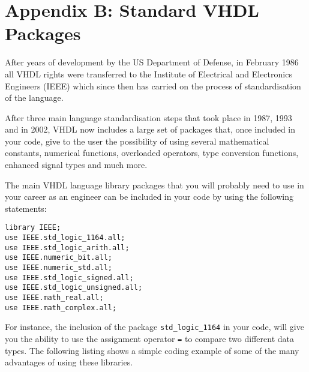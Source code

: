 \null\newpage
\thispagestyle{empty}
\mbox{}

\chapter{Appendix B: Standard VHDL Packages}
After years of development by the US Department of Defense, in February 1986 all VHDL rights were transferred to the Institute of Electrical and Electronics Engineers (IEEE) which since then has carried on the process of standardisation of the language. 

After three main language standardisation steps that took place in 1987, 1993 and in 2002, VHDL now includes a large set of packages that, once included in your code, give to the user the possibility of using several mathematical constants, numerical functions, overloaded operators, type conversion functions, enhanced signal types and much more.

The main VHDL language library packages that you will probably need to use in your career as an engineer can be included in your code by using the following statements:

\begin{verbatim}
library IEEE;
use IEEE.std_logic_1164.all;
use IEEE.std_logic_arith.all;
use IEEE.numeric_bit.all;
use IEEE.numeric_std.all;
use IEEE.std_logic_signed.all;
use IEEE.std_logic_unsigned.all;
use IEEE.math_real.all;
use IEEE.math_complex.all;
\end{verbatim}

For instance, the inclusion of the package \texttt{std\_logic\_1164} in your code, will give you the ability to use the assignment operator \texttt{=} to compare two different data types. The following listing shows a simple coding example of some of the many advantages of using these libraries.
\newpage
\clearpage

